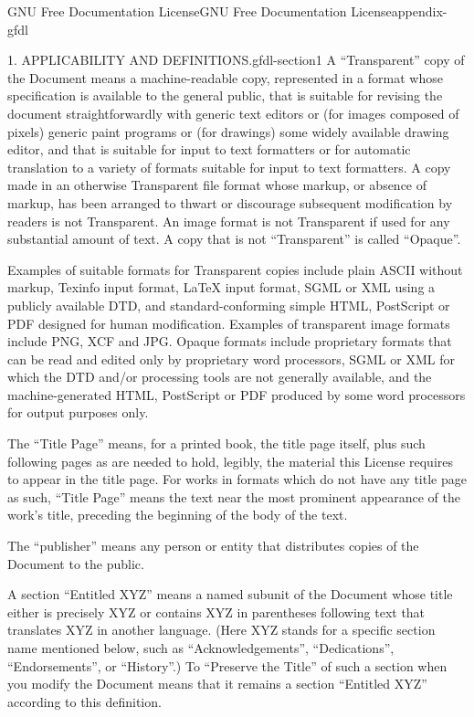 \documentclass[oneside,10pt,]{book}
\numberwithin{equation}{section}
\begin{document}
\begin{appendixptx}{GNU Free Documentation License}{}{GNU Free Documentation License}{}{}{appendix-gfdl}
\begin{paragraphs}{1. APPLICABILITY AND DEFINITIONS.}{gfdl-section1}
A ``Transparent'' copy of the Document means a machine-readable copy, represented in a format whose specification is available to the general public, that is suitable for revising the document straightforwardly with generic text editors or (for images composed of pixels) generic paint programs or (for drawings) some widely available drawing editor, and that is suitable for input to text formatters or for automatic translation to a variety of formats suitable for input to text formatters. A copy made in an otherwise Transparent file format whose markup, or absence of markup, has been arranged to thwart or discourage subsequent modification by readers is not Transparent. An image format is not Transparent if used for any substantial amount of text. A copy that is not ``Transparent'' is called ``Opaque''.%
\par
\hypertarget{p-1567}{}%
Examples of suitable formats for Transparent copies include plain ASCII without markup, Texinfo input format, LaTeX input format, SGML or XML using a publicly available DTD, and standard-conforming simple HTML, PostScript or PDF designed for human modification. Examples of transparent image formats include PNG, XCF and JPG. Opaque formats include proprietary formats that can be read and edited only by proprietary word processors, SGML or XML for which the DTD and\slash{}or processing tools are not generally available, and the machine-generated HTML, PostScript or PDF produced by some word processors for output purposes only.%
\par
\hypertarget{p-1568}{}%
The ``Title Page'' means, for a printed book, the title page itself, plus such following pages as are needed to hold, legibly, the material this License requires to appear in the title page. For works in formats which do not have any title page as such, ``Title Page'' means the text near the most prominent appearance of the work's title, preceding the beginning of the body of the text.%
\par
\hypertarget{p-1569}{}%
The ``publisher'' means any person or entity that distributes copies of the Document to the public.%
\par
\hypertarget{p-1570}{}%
A section ``Entitled XYZ'' means a named subunit of the Document whose title either is precisely XYZ or contains XYZ in parentheses following text that translates XYZ in another language. (Here XYZ stands for a specific section name mentioned below, such as ``Acknowledgements'', ``Dedications'', ``Endorsements'', or ``History''.) To ``Preserve the Title'' of such a section when you modify the Document means that it remains a section ``Entitled XYZ'' according to this definition.%

\end{paragraphs}
\end{appendixptx}
\end{document}
